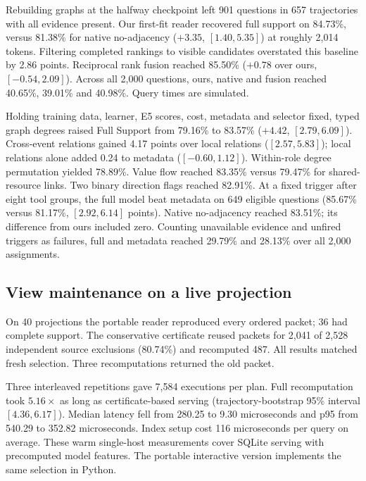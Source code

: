 \documentclass[conference]{IEEEtran}
\begin{document}
Rebuilding graphs at the halfway checkpoint left 901 questions in 657 trajectories with all evidence present. Our first-fit reader recovered full support on 84.73\%, versus 81.38\% for native no-adjacency ($+3.35$, $[1.40,5.35]$) at roughly 2,014 tokens. Filtering completed rankings to visible candidates overstated this baseline by 2.86 points. Reciprocal rank fusion reached 85.50\% ($+0.78$ over ours, $[-0.54,2.09]$). Across all 2,000 questions, ours, native and fusion reached 40.65\%, 39.01\% and 40.98\%. Query times are simulated.

Holding training data, learner, E5 scores, cost, metadata and selector fixed, typed graph degrees raised Full Support from 79.16\% to 83.57\% ($+4.42$, $[2.79,6.09]$). Cross-event relations gained 4.17 points over local relations ($[2.57,5.83]$); local relations alone added 0.24 to metadata ($[-0.60,1.12]$). Within-role degree permutation yielded 78.89\%. Value flow reached 83.35\% versus 79.47\% for shared-resource links. Two binary direction flags reached 82.91\%. At a fixed trigger after eight tool groups, the full model beat metadata on 649 eligible questions (85.67\% versus 81.17\%, $[2.92,6.14]$ points). Native no-adjacency reached 83.51\%; its difference from ours included zero. Counting unavailable evidence and unfired triggers as failures, full and metadata reached 29.79\% and 28.13\% over all 2,000 assignments.


\subsection{View maintenance on a live projection}
On 40 projections the portable reader reproduced every ordered packet; 36 had complete support. The conservative certificate reused packets for 2,041 of 2,528 independent source exclusions (80.74\%) and recomputed 487. All results matched fresh selection. Three recomputations returned the old packet.

Three interleaved repetitions gave 7,584 executions per plan. Full recomputation took $5.16\times$ as long as certificate-based serving (trajectory-bootstrap 95\% interval $[4.36,6.17]$). Median latency fell from 280.25 to 9.30 microseconds and p95 from 540.29 to 352.82 microseconds. Index setup cost 116 microseconds per query on average. These warm single-host measurements cover SQLite serving with precomputed model features. The portable interactive version implements the same selection in Python.
\end{document}
